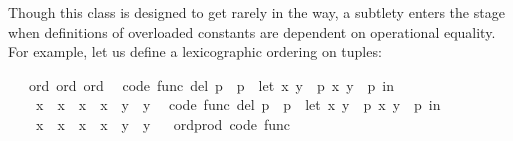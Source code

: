 \begin{isabellebody}
\begin{isamarkuptext}
  Though this  class is designed to get rarely in
  the way, a subtlety
  enters the stage when definitions of overloaded constants
  are dependent on operational equality.  For example, let
  us define a lexicographic ordering on tuples:%
\end{isamarkuptext}%
\isamarkuptrue%
\isamarkupfalse%
\ {\isacharasterisk}\ {\isacharcolon}{\isacharcolon}\ {\isacharparenleft}ord{\isacharcomma}\ ord{\isacharparenright}\ ord\isanewline
{}\isanewline
\isanewline
{}\isamarkupfalse%
\isanewline
\ \ {\isacharbrackleft}code\ func\ del{\isacharbrackright}{\isacharcolon}\ {\isachardoublequoteopen}p{}\ {\isacharless}\ p{}\ {\isasymlongleftrightarrow}\ {\isacharparenleft}let\ {\isacharparenleft}x{}{\isacharcomma}\ y{}{\isacharparenright}\ {\isacharequal}\ p{}{\isacharsemicolon}\ {\isacharparenleft}x{}{\isacharcomma}\ y{}{\isacharparenright}\ {\isacharequal}\ p{}\ in\isanewline
\ \ \ \ x{}\ {\isacharless}\ x{}\ {\isasymor}\ {\isacharparenleft}x{}\ {\isacharequal}\ x{}\ {\isasymand}\ y{}\ {\isacharless}\ y{}{\isacharparenright}{\isacharparenright}{\isachardoublequoteclose}\isanewline
\isanewline
{}\isamarkupfalse%
\isanewline
\ \ {\isacharbrackleft}code\ func\ del{\isacharbrackright}{\isacharcolon}\ {\isachardoublequoteopen}p{}\ {\isasymle}\ p{}\ {\isasymlongleftrightarrow}\ {\isacharparenleft}let\ {\isacharparenleft}x{}{\isacharcomma}\ y{}{\isacharparenright}\ {\isacharequal}\ p{}{\isacharsemicolon}\ {\isacharparenleft}x{}{\isacharcomma}\ y{}{\isacharparenright}\ {\isacharequal}\ p{}\ in\isanewline
\ \ \ \ x{}\ {\isacharless}\ x{}\ {\isasymor}\ {\isacharparenleft}x{}\ {\isacharequal}\ x{}\ {\isasymand}\ y{}\ {\isasymle}\ y{}{\isacharparenright}{\isacharparenright}{\isachardoublequoteclose}\isanewline
\isanewline
{}\isamarkupfalse%
%
\isadelimproof
\ %
\endisadelimproof
%
\isatagproof
\isacommand{{\isachardot}{\isachardot}}\isamarkupfalse%
%
\endisatagproof
{\isafoldproof}%
%
\isadelimproof
%
\endisadelimproof
\isanewline
\isanewline
{}\isamarkupfalse%
\isanewline
\isanewline
{}\isamarkupfalse%
\ ord{\isacharunderscore}prod\ {\isacharbrackleft}code\ func{\isacharbrackright}{\isacharcolon}\isanewline

\end{isabellebody}
